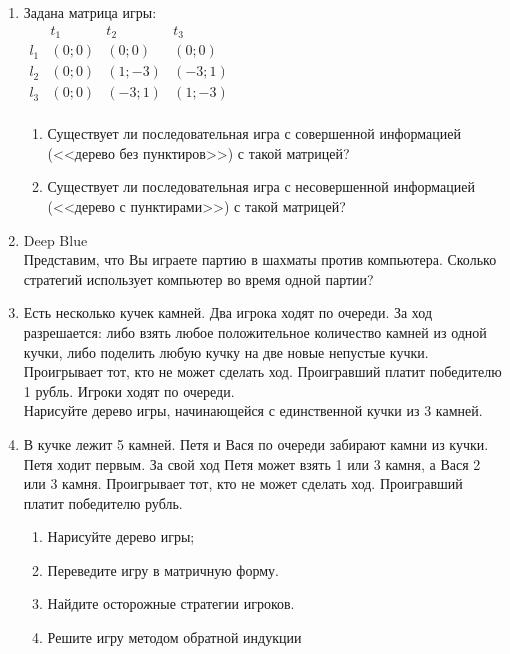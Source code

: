 \documentclass[pdftex,12pt,a4paper]{article}
\begin{document}
\begin{enumerate}
\item Задана матрица игры:\\
$\begin{array}{c|ccc}
    {} &  {t_1 } & {t_2 } & {t_3 }   \\
\hline
    {l_1 } &  {\left( {0;0} \right)} & {\left( {0;0} \right)} & {\left( {0;0} \right)}   \\
    {l_2 } &  {\left( {0;0} \right)} & {\left( {1; - 3} \right)} & {\left( { - 3;1} \right)}   \\
    {l_3 } &  {\left( {0;0} \right)} & {\left( { - 3;1} \right)} & {\left( {1; - 3} \right)}   \\
\end{array}$
\begin{enumerate}
\item Существует ли последовательная игра с совершенной информацией (<<дерево без пунктиров>>) с такой матрицей? 
\item Существует ли последовательная игра с несовершенной информацией (<<дерево с пунктирами>>) с такой матрицей? 
\end{enumerate}

\item Deep Blue\\
Представим, что Вы играете партию в шахматы против компьютера. Сколько стратегий использует компьютер во время одной партии?

\item Есть несколько кучек камней. Два игрока ходят по очереди. За ход разрешается: либо взять любое положительное количество камней из одной кучки, либо поделить любую кучку на две новые непустые кучки. Проигрывает тот, кто не может сделать ход. Проигравший платит победителю 1 рубль. Игроки ходят по очереди.\\
Нарисуйте дерево игры, начинающейся с единственной кучки из 3 камней.

\item В кучке лежит 5 камней. Петя и Вася по очереди забирают камни из кучки. Петя ходит первым. За свой ход Петя может взять 1 или 3 камня, а Вася 2 или 3 камня. Проигрывает тот, кто не может сделать ход. Проигравший платит победителю рубль.
\begin{enumerate}
\item Нарисуйте дерево игры;
\item Переведите игру в матричную форму.
\item Найдите осторожные стратегии игроков.
\item Решите игру методом обратной индукции
\end{enumerate}


\end{enumerate}
\end{document}
